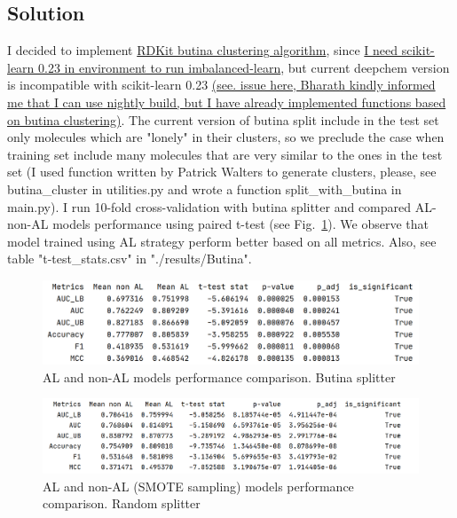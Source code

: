 \documentclass[a4paper,10pt]{article}
\begin{document}
\subsection{Solution}
I decided to implement \href{https://www.rdkit.org/docs/source/rdkit.ML.Cluster.Butina.html}{RDKit butina clustering algorithm}\cite{butina1999unsupervised}, since \href{https://imbalanced-learn.org/stable/install.html}{I need scikit-learn 0.23 in environment to run imbalanced-learn}, but current deepchem version is incompatible with scikit-learn 0.23 \href{https://github.com/deepchem/deepchem/issues/1861}{(see. issue here, Bharath kindly informed me that I can use nightly build, but I have already implemented functions based on butina clustering)}. The current version of butina split include in the test set only molecules which are "lonely" in their clusters, so we preclude the case when training set include many molecules that are very similar to the ones in the test set (I used function written by Patrick Walters to generate clusters, please, see butina\_cluster in utilities.py and wrote a function split\_with\_butina in main.py). I run 10-fold cross-validation with butina splitter and compared AL- non-AL models performance using paired t-test (see Fig.~\ref{fig:1}). We observe that model trained using AL strategy perform better based on all metrics. Also, see table "t-test\_stats.csv" in "./results/Butina".



\begin{figure}[1]
    \centering
    \includegraphics[keepaspectratio=true, scale=0.33]{images/Butina.png}
    \caption{AL and non-AL models performance comparison. Butina splitter}
    \label{fig:1}
\end{figure}

\begin{figure}[2]
    \centering
    \includegraphics[keepaspectratio=true, scale=0.31]{images/SMOTE_1.png}
    \caption{AL and non-AL (SMOTE sampling) models performance comparison. Random splitter}
    \label{fig:2}
\end{figure}
\end{document}
